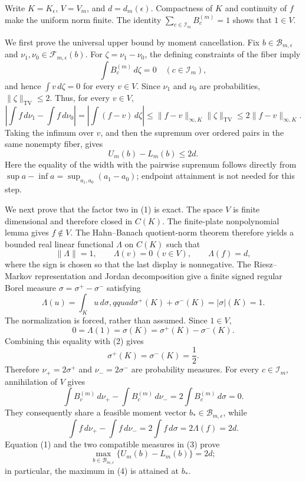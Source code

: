 Write \(K=K_{\epsilon}\), \(V=V_m\), and \(d=d_m(\epsilon)\).  Compactness of \(K\) and continuity of \(f\) make the uniform norm finite.  The identity \(\sum_{c\in\mathcal I_m}B_c^{(m)}=1\) shows that \(1\in V\).

We first prove the universal upper bound by moment cancellation.  Fix \(b\in\mathcal B_{m,\epsilon}\) and \(\nu_1,\nu_0\in\mathcal F_{m,\epsilon}(b)\).  For \(\zeta=\nu_1-\nu_0\), the defining constraints of the fiber imply
\[
 \int B_c^{(m)}\,d\zeta=0\quad(c\in\mathcal I_m),
\]
and hence \(\int v\,d\zeta=0\) for every \(v\in V\).  Since \(\nu_1\) and \(\nu_0\) are probabilities, \(\|\zeta\|_{\mathrm{TV}}\leq2\).  Thus, for every \(v\in V\),
\[
 \left|\int f\,d\nu_1-\int f\,d\nu_0\right|
 =\left|\int(f-v)\,d\zeta\right|
 \leq\|f-v\|_{\infty,K}\|\zeta\|_{\mathrm{TV}}
 \leq2\|f-v\|_{\infty,K}.
\]
Taking the infimum over \(v\), and then the supremum over ordered pairs in the same nonempty fiber, gives
\[
 U_m(b)-L_m(b)\leq2d. \tag{1}
\]
Here the equality of the width with the pairwise supremum follows directly from \(\sup a-\inf a=\sup_{a_1,a_0}(a_1-a_0)\); endpoint attainment is not needed for this step.

We next prove that the factor two in (1) is exact.  The space \(V\) is finite dimensional and therefore closed in \(C(K)\).  The finite-plate nonpolynomial lemma gives \(f\notin V\).  The Hahn--Banach quotient-norm theorem therefore yields a bounded real linear functional \(\Lambda\) on \(C(K)\) such that
\[
 \|\Lambda\|=1,\qquad \Lambda(v)=0\ (v\in V),\qquad \Lambda(f)=d,
\]
where the sign is chosen so that the last display is nonnegative.  The Riesz--Markov representation and Jordan decomposition give a finite signed regular Borel measure \(\sigma=\sigma^+-\sigma^-\) satisfying
\[
 \Lambda(u)=\int_Ku\,d\sigma,qquad
 \sigma^+(K)+\sigma^-(K)=|\sigma|(K)=1. \tag{2}
\]
The normalization is forced, rather than assumed.  Since \(1\in V\),
\[
 0=\Lambda(1)=\sigma(K)=\sigma^+(K)-\sigma^-(K).
\]
Combining this equality with (2) gives
\[
 \sigma^+(K)=\sigma^-(K)=\frac12.
\]
Therefore \(\nu_+=2\sigma^+\) and \(\nu_-=2\sigma^-\) are probability measures.  For every \(c\in\mathcal I_m\), annihilation of \(V\) gives
\[
 \int B_c^{(m)}\,d\nu_+-\int B_c^{(m)}\,d\nu_-
 =2\int B_c^{(m)}\,d\sigma=0.
\]
They consequently share a feasible moment vector \(b_*\in\mathcal B_{m,\epsilon}\), while
\[
 \int f\,d\nu_+-\int f\,d\nu_-
 =2\int f\,d\sigma=2\Lambda(f)=2d. \tag{3}
\]
Equation (1) and the two compatible measures in (3) prove
\[
 \max_{b\in\mathcal B_{m,\epsilon}}\{U_m(b)-L_m(b)\}=2d; \tag{4}
\]
in particular, the maximum in (4) is attained at \(b_*\).

